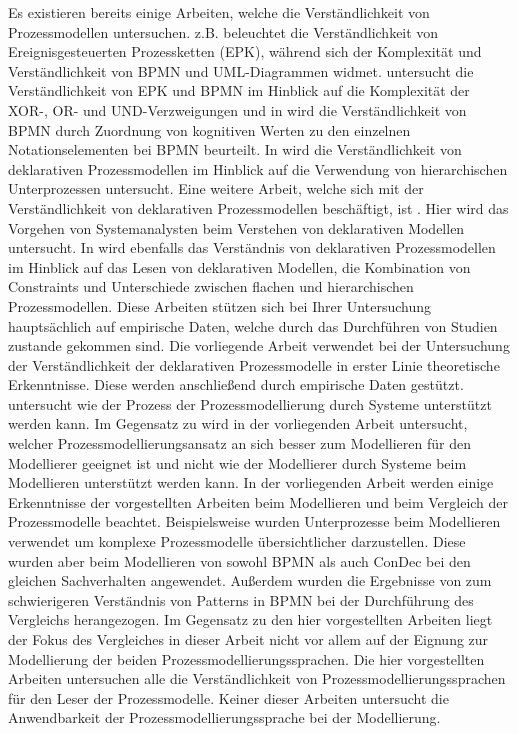 Es existieren bereits einige Arbeiten, welche die Verständlichkeit von Prozessmodellen untersuchen. \cite{bpm07} z.B. beleuchtet die Verständlichkeit von Ereignisgesteuerten Prozessketten (EPK), während sich \cite{gruhn2006complexity} der Komplexität und Verständlichkeit von BPMN und UML-Diagrammen widmet. \cite{reijers2011study} untersucht die Verständlichkeit von EPK und BPMN im Hinblick auf die Komplexität der XOR-, OR- und UND-Verzweigungen und in\cite{gruhn2006adopting} wird die Verständlichkeit von BPMN durch Zuordnung von kognitiven Werten zu den einzelnen Notationselementen bei BPMN beurteilt. \newline
In \cite{sabrina942} wird die Verständlichkeit von deklarativen Prozessmodellen im Hinblick auf die Verwendung von hierarchischen Unterprozessen untersucht. Eine weitere Arbeit, welche sich mit der Verständlichkeit von deklarativen Prozessmodellen beschäftigt, ist \cite{haisjackl2014understanding}. Hier wird das Vorgehen von Systemanalysten beim Verstehen von deklarativen Modellen untersucht. In \cite{sabrina933} wird ebenfalls das Verständnis von deklarativen Prozessmodellen im Hinblick auf das Lesen von deklarativen Modellen, die Kombination von Constraints und Unterschiede zwischen flachen und hierarchischen Prozessmodellen. Diese Arbeiten stützen sich bei Ihrer Untersuchung hauptsächlich auf empirische Daten, welche durch das Durchführen von Studien zustande gekommen sind. Die vorliegende Arbeit verwendet bei der Untersuchung der Verständlichkeit der deklarativen Prozessmodelle in erster Linie theoretische Erkenntnisse. Diese werden anschließend durch empirische Daten gestützt. \newline
\cite{pinggera2010investigating} untersucht wie der Prozess der Prozessmodellierung durch Systeme unterstützt werden kann. Im Gegensatz zu \cite{pinggera2010investigating} wird in der vorliegenden Arbeit untersucht, welcher Prozessmodellierungsansatz an sich besser zum Modellieren für den Modellierer geeignet ist und nicht wie der Modellierer durch Systeme beim Modellieren unterstützt werden kann.\newline
In der vorliegenden Arbeit werden einige Erkenntnisse der vorgestellten Arbeiten beim Modellieren und beim Vergleich der Prozessmodelle beachtet. Beispielsweise wurden Unterprozesse beim  Modellieren verwendet um komplexe Prozessmodelle übersichtlicher darzustellen. Diese wurden  aber beim Modellieren von sowohl BPMN als auch ConDec bei den gleichen Sachverhalten angewendet.\newline
Außerdem wurden die Ergebnisse von \cite{gruhn2006adopting} zum schwierigeren Verständnis von Patterns in BPMN bei der Durchführung des Vergleichs herangezogen.\newline
Im Gegensatz zu den hier vorgestellten Arbeiten liegt der Fokus des Vergleiches in dieser Arbeit nicht vor allem auf der Eignung zur Modellierung der beiden Prozessmodellierungssprachen. Die hier vorgestellten Arbeiten untersuchen alle die Verständlichkeit von Prozessmodellierungssprachen für den Leser der Prozessmodelle. Keiner dieser Arbeiten untersucht die Anwendbarkeit der Prozessmodellierungssprache bei der Modellierung. \newline


